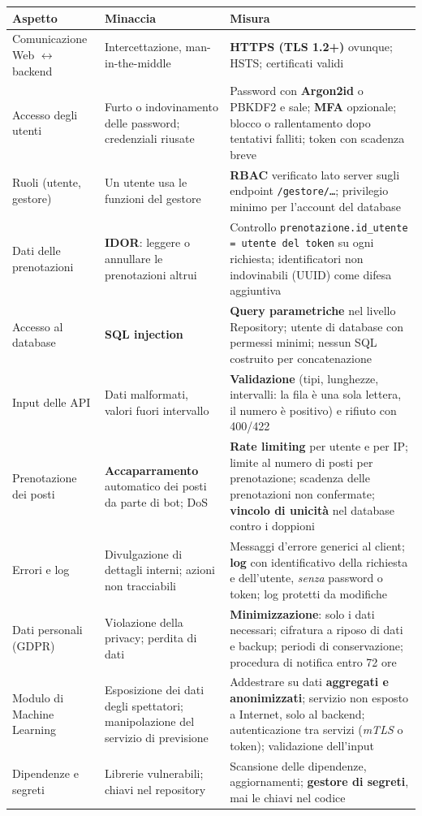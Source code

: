 \begin{center}
\small
\begin{tabularx}{\textwidth}{@{}>{\raggedright\arraybackslash}p{3.2cm}>{\raggedright\arraybackslash}p{3.5cm}X@{}}
\toprule
\textbf{Aspetto} & \textbf{Minaccia} & \textbf{Misura} \\
\midrule
Comunicazione Web $\leftrightarrow$ backend & Intercettazione, man-in-the-middle & \textbf{HTTPS (TLS 1.2+)} ovunque; HSTS; certificati validi \\
Accesso degli utenti & Furto o indovinamento delle password; credenziali riusate & Password con \textbf{Argon2id} o PBKDF2 e sale; \textbf{MFA} opzionale; blocco o rallentamento dopo tentativi falliti; token con scadenza breve \\
Ruoli (utente, gestore) & Un utente usa le funzioni del gestore & \textbf{RBAC} verificato lato server sugli endpoint \texttt{/gestore/\ldots}; privilegio minimo per l'account del database \\
Dati delle prenotazioni & \textbf{IDOR}: leggere o annullare le prenotazioni altrui & Controllo \texttt{prenotazione.id\_utente = utente del token} su ogni richiesta; identificatori non indovinabili (UUID) come difesa aggiuntiva \\
Accesso al database & \textbf{SQL injection} & \textbf{Query parametriche} nel livello Repository; utente di database con permessi minimi; nessun SQL costruito per concatenazione \\
Input delle API & Dati malformati, valori fuori intervallo & \textbf{Validazione} (tipi, lunghezze, intervalli: la fila è una sola lettera, il numero è positivo) e rifiuto con 400/422 \\
Prenotazione dei posti & \textbf{Accaparramento} automatico dei posti da parte di bot; DoS & \textbf{Rate limiting} per utente e per IP; limite al numero di posti per prenotazione; scadenza delle prenotazioni non confermate; \textbf{vincolo di unicità} nel database contro i doppioni \\
Errori e log & Divulgazione di dettagli interni; azioni non tracciabili & Messaggi d'errore generici al client; \textbf{log} con identificativo della richiesta e dell'utente, \emph{senza} password o token; log protetti da modifiche \\
Dati personali (GDPR) & Violazione della privacy; perdita di dati & \textbf{Minimizzazione}: solo i dati necessari; cifratura a riposo di dati e backup; periodi di conservazione; procedura di notifica entro 72 ore \\
Modulo di Machine Learning & Esposizione dei dati degli spettatori; manipolazione del servizio di previsione & Addestrare su dati \textbf{aggregati e anonimizzati}; servizio non esposto a Internet, solo al backend; autenticazione tra servizi (\emph{mTLS} o token); validazione dell'input \\
Dipendenze e segreti & Librerie vulnerabili; chiavi nel repository & Scansione delle dipendenze, aggiornamenti; \textbf{gestore di segreti}, mai le chiavi nel codice \\
\bottomrule
\end{tabularx}
\end{center}

